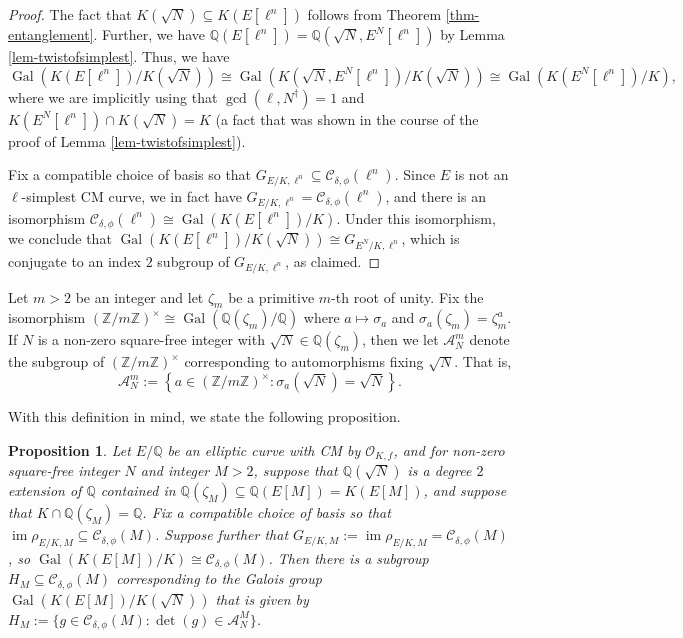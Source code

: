 \documentclass[11pt]{amsart}
\newtheorem{proposition}[defn]{Proposition}
\theoremstyle{definition}
\newcommand{\Q}{\mathbb{Q}}
\newcommand{\Z}{\mathbb{Z}}
\newcommand{\Of}{\mathcal{O}_{K,f}}
\newcommand{\Gal}{\operatorname{Gal}}
\DeclareMathOperator{\im}{im}  %
\begin{document}
\begin{proof}    
    The fact that $K(\sqrt{N}) \subseteq K(E[\ell^n])$ follows from Theorem \ref{thm-entanglement}. Further, we have $\Q(E[\ell^n]) = \Q(\sqrt{N}, E^N[\ell^n])$ by Lemma \ref{lem-twistofsimplest}. Thus, we have
    \[ \Gal(K(E[\ell^n])/K(\sqrt{N})) \cong \Gal(K(\sqrt{N}, E^N[\ell^n])/K(\sqrt{N})) \cong \Gal(K(E^N[\ell^n])/K),\]
    where we are implicitly using that $\gcd(\ell,N^\dagger)=1$ and  $K(E^N[\ell^n])\cap K(\sqrt{N})=K$ (a fact that was shown in the course of the proof of Lemma \ref{lem-twistofsimplest}).

    Fix a compatible choice of basis so that $G_{E/K, \ell^n} \subseteq \mathcal{C}_{\delta, \phi}(\ell^n)$. Since $E$ is not an $\ell$-simplest CM curve, we in fact have $G_{E/K, \ell^n} = \mathcal{C}_{\delta, \phi}(\ell^n)$, and there is an isomorphism $\mathcal{C}_{\delta, \phi}(\ell^n) \cong \Gal(K(E[\ell^n])/K)$. Under this isomorphism, we conclude that $\Gal(K(E[\ell^n])/K(\sqrt{N})) \cong G_{E^N/K, \ell^n}$, which is conjugate to an index $2$ subgroup of $G_{E/K, \ell^n}$, as claimed.
\end{proof}


Let $m > 2$ be an integer and let $\zeta_m$ be a primitive $m$-th root of unity. Fix the isomorphism $(\Z/m\Z)^{\times} \cong \Gal(\Q(\zeta_m)/\Q)$ where $a \mapsto \sigma_a$ and $\sigma_a(\zeta_m) = \zeta_m^a$. If $N$ is a non-zero square-free integer with $\sqrt{N} \in \Q(\zeta_m)$, then we let $\mathcal{A}_{N}^{m}$ denote the subgroup of $(\Z/m\Z)^{\times}$ corresponding to automorphisms fixing $\sqrt{N}$. That is,
\begin{equation}\label{eq_An}
    \mathcal{A}_{N}^{m} := \left\{ a \in (\Z/m\Z)^{\times} : \sigma_a(\sqrt{N}) = \sqrt{N} \right\}.
\end{equation}

With this definition in mind, we state the following proposition.

\begin{proposition}\label{prop-MfixingN}
    Let $E/\Q$ be an elliptic curve with CM by $\Of$, and for non-zero square-free integer $N$ and integer $M > 2$, suppose that $\Q(\sqrt{N})$ is a degree $2$ extension of $\Q$ contained in $\Q(\zeta_M) \subseteq \Q(E[M]) = K(E[M])$, and suppose that $K \cap \Q(\zeta_M) = \Q$. Fix a compatible choice of basis so that $\im \rho_{E/K, M} \subseteq \mathcal{C}_{\delta, \phi}(M)$.
    Suppose further that $G_{E/K, M} := \im \rho_{E/K, M} = \mathcal{C}_{\delta, \phi}(M)$, so $\Gal(K(E[M])/K) \cong \mathcal{C}_{\delta, \phi}(M)$. Then there is a subgroup $H_{M} \subseteq \mathcal{C}_{\delta, \phi}(M)$ corresponding to the Galois group $\Gal(K(E[M])/K(\sqrt{N}))$ that is given by $H_{M} := \{ g \in \mathcal{C}_{\delta, \phi}(M) : \det(g) \in \mathcal{A}_{N}^{M} \}$.
    \end{proposition}
\end{document}
